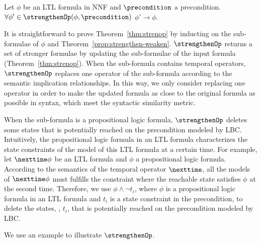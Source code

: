 \begin{theorem}\label{thm:strenop}
    Let $\phi$ be an LTL formula in NNF and $\precondition$ a precondition.
    $\forall \phi' \in \strengthenOp(\phi,\precondition)$ \suchthat $\phi' \to \phi$.
\end{theorem}

It is straightforward to prove Theorem~\ref{thm:strenop} by inducting on the sub-formulae of $\phi$ and Theorem~\ref{prop:strengthen-weaken}.
$\strengthenOp$ returns a set of stronger formulae by updating the sub-formulae of the input formula (Theorem~\ref{thm:strenop}).
When the sub-formula contains temporal operators, $\strengthenOp$ replaces one operator of the sub-formula according to the semantic implication relationships. 
In this way, we only consider replacing one operator in order to make the updated formula as close to the original formula as possible in syntax, which meet the syntactic similarity metric.

When the sub-formula is a propositional logic formula, $\strengthenOp$ deletes some states that is potentially reached on the precondition modeled by LBC. 
Intuitively, the propositional logic formula in an LTL formula characterizes the state constraints of the model of this LTL formula at a certain time.
For example, let $\nexttime \phi$ be an LTL formula and $\phi$ a propositional logic formula.
According to the semantics of the temporal operator $\nexttime$, all the models of $\nexttime \phi$ must fulfills the constraint where the reachable state satisfies $\phi$ at the second time.
Therefore, we use $\phi \land \lnot t_i$, where $\phi$ is a propositional logic formula in an LTL formula and $t_i$ is a state constraint in the precondition, to delete the states, \ie, $t_i$, that is potentially reached on the precondition modeled by LBC. 

We use an example to illustrate $\strengthenOp$.
\begin{example}

\end{example}

